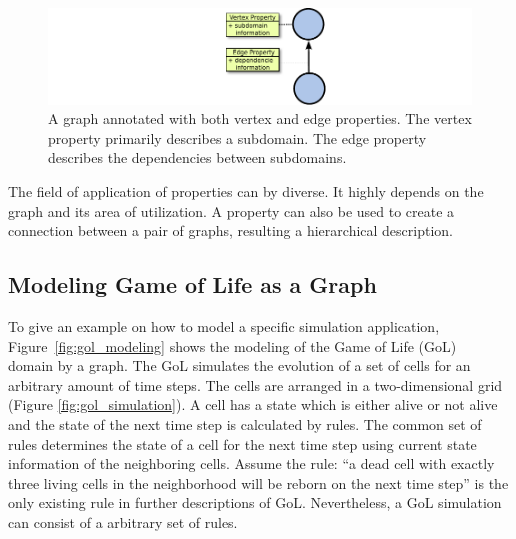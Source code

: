 \begin{figure}[H]
  \centering \includegraphics[width=\textwidth]{graphics/30_property}
  \caption{A graph annotated with both vertex and edge properties. The vertex
    property primarily describes a subdomain. The edge property
    describes the dependencies between subdomains.}
  \label{fig:property}
\end{figure}

\noindent The field of application of properties can by diverse. It highly
depends on the graph and its area of utilization.  A property can also
be used to create a connection between a pair of graphs, resulting a
hierarchical description.



\subsection{Modeling Game of Life as a Graph}
\label{sec:gol}
To give an example on how to model a specific simulation application,
Figure~\ref{fig:gol_modeling} shows the modeling of the Game of Life
(GoL)~\cite{ref:gol} domain by a graph. The GoL simulates the evolution of
a set of cells for an arbitrary amount of time steps. The cells are
arranged in a two-dimensional grid (Figure \ref{fig:gol_simulation}).
A cell has a state which is either alive or not alive and the state of
the next time step is calculated by rules.  The common set of rules
determines the state of a cell for the next time step using current
state information of the neighboring cells.  Assume the rule: ``a dead
cell with exactly three living cells in the neighborhood will be reborn on
the next time step'' is the only existing rule in further descriptions
of GoL.  Nevertheless, a GoL simulation can consist of a arbitrary set
of rules.


